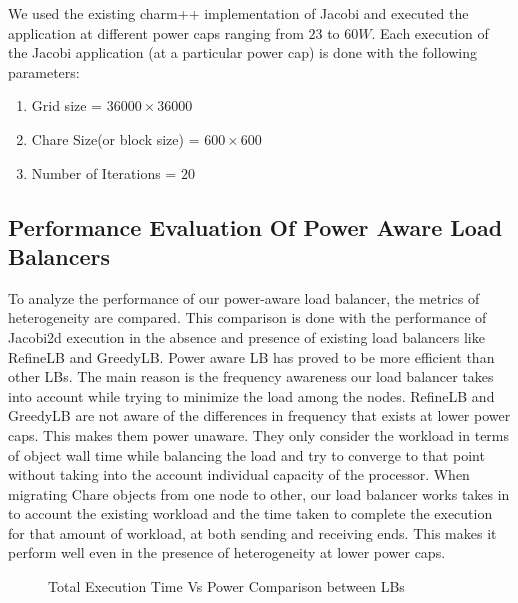 We used the existing charm++ implementation of Jacobi and executed the
application at different power caps ranging from $23$ to $60 W$.  Each
execution of the Jacobi application (at a particular power cap) is done with
the following parameters:

\begin{enumerate}
\item Grid size                   = $ 36000 \times 36000$
\item Chare Size(or block size)   = $600 \times 600$
\item Number of Iterations        = $20$
\end{enumerate}

\subsection{Performance Evaluation Of Power Aware Load Balancers}
To analyze the performance of our power-aware load balancer, the metrics of
heterogeneity are compared. This comparison is done with the performance of
Jacobi2d execution in the absence and presence of existing load balancers
like RefineLB and GreedyLB. Power aware LB has proved to be more efficient
than other LBs. The main reason is the frequency awareness our load balancer
takes into account while trying to minimize the load among the nodes.
RefineLB and GreedyLB are not aware of the differences in frequency that
exists at lower power caps. This makes them power unaware. They only consider
the workload in terms of object wall time while balancing the load and try to
converge to that point without taking into the account individual capacity of
the processor. When migrating Chare objects from one node to other, our load
balancer works takes in to account the existing workload and the time taken
to complete the execution for that amount of workload, at both sending and
receiving ends. This makes it perform well even in the presence of
heterogeneity at lower power caps.

\begin{figure}
\centering
\caption{Total Execution Time Vs Power Comparison between LBs} 
\label{fig:final_exec_time_vs_power}
\end{figure}

